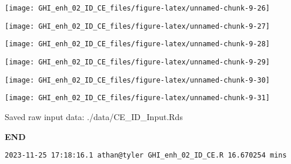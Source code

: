 \documentclass[
  10pt,
  a4paper,oneside]{article}
\begin{document}
\begin{center}\texttt{[image: GHI\_enh\_02\_ID\_CE\_files/figure-latex/unnamed-chunk-9-26]} \end{center}

\begin{center}\texttt{[image: GHI\_enh\_02\_ID\_CE\_files/figure-latex/unnamed-chunk-9-27]} \end{center}

\begin{center}\texttt{[image: GHI\_enh\_02\_ID\_CE\_files/figure-latex/unnamed-chunk-9-28]} \end{center}

\begin{center}\texttt{[image: GHI\_enh\_02\_ID\_CE\_files/figure-latex/unnamed-chunk-9-29]} \end{center}

\begin{center}\texttt{[image: GHI\_enh\_02\_ID\_CE\_files/figure-latex/unnamed-chunk-9-30]} \end{center}

\begin{center}\texttt{[image: GHI\_enh\_02\_ID\_CE\_files/figure-latex/unnamed-chunk-9-31]} \end{center}

Saved raw input data: ./data/CE\_ID\_Input.Rds

\textbf{END}

\begin{verbatim}
2023-11-25 17:18:16.1 athan@tyler GHI_enh_02_ID_CE.R 16.670254 mins
\end{verbatim}
\end{document}
